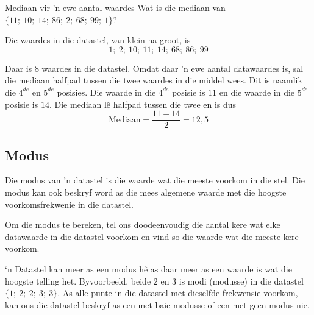 \begin{wex}{Mediaan vir 'n ewe aantal waardes}
{Wat is die mediaan van $\{11;\ 10;\ 14;\ 86;\ 2;\ 68;\ 99;\ 1\}$?}
{

  Die waardes in die datastel, van klein na groot, is
  \begin{equation*}
    1;\ 2;\ 10;\ 11;\ 14;\ 68;\ 86;\ 99
  \end{equation*}


  Daar is $8$ waardes in die datastel. Omdat daar 'n ewe aantal datawaardes is, sal die mediaan halfpad tussen die twee waardes in die middel wees. Dit is naamlik die $4^{de}$ en $5^{de}$ posisies. Die waarde in die 
  $4^{de}$ posisie is $11$ en die waarde in die $5^{de}$ posisie is
  $14$. Die mediaan l\^e halfpad tussen die twee en is dus
  \begin{equation*}
    \mbox{Mediaan} = \frac{11+14}{2} = 12,5
  \end{equation*}
}
\end{wex}

\subsection{Modus}
{Die modus van 'n datastel is die waarde wat die meeste voorkom in die stel. Die modus kan ook beskryf word as die mees algemene waarde met die hoogste voorkomsfrekwenie in die datastel.}

Om die modus te bereken, tel ons doodeenvoudig die aantal kere wat elke datawaarde in die datastel voorkom en vind so die waarde wat die meeste kere voorkom.\par

‘n Datastel kan meer as een modus hê as daar meer as een waarde is wat die hoogste telling het. Byvoorbeeld, beide $2$ en $3$ is modi (modusse) in die datastel $\{1;\ 2;\ 2;\ 3;\ 3\}$. As alle punte in die datastel met dieselfde frekwensie voorkom, kan ons die datastel beskryf as een met baie modusse of een met geen modus nie. 

